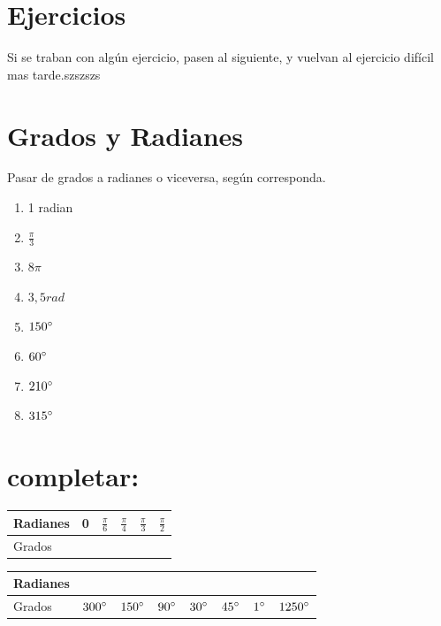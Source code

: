 \documentclass[a4paper,11pt,spanish,sans]{exam}
\newcommand{\Ts}{\rule{0pt}{2.6ex}}       %
\newcommand{\Bs}{\rule[-1.2ex]{0pt}{0pt}} %
\begin{document}
\section*{Ejercicios}

Si se traban con algún ejercicio, pasen al siguiente, y vuelvan al ejercicio difícil mas tarde.szszszs




\section{Grados y Radianes}

Pasar de grados a radianes o viceversa, según corresponda.

\begin{enumerate}
\item 1 radian
\item $\frac{\pi}{3}$
\item $8\pi$
\item $3,5 rad$
\item $150\degree$
\item $60\degree$
\item $210\degree$
\item $315\degree$
\end{enumerate}

\section{completar:}

\begin{center}
\label{completar}
\begin{tabular}{|l|c|c|c|c|c|}
\hline
Radianes & 0 & $\frac{\pi}{6} $ & $\frac{\pi}{4} $ & $\frac{\pi}{3} $ & $\frac{\pi}{2} $ \Ts \Bs \\ \hline
Grados  &    &  &   &   &    \Ts \Bs     \\ \hline
\end{tabular}
\end{center}

\begin{center}
\label{completar}
\begin{tabular}{|l|c|c|c|c|c|c|c|}
\hline
Radianes &  &  &   &   &  &  & \Ts \Bs \\ \hline
Grados  & $300\degree$   & $150\degree$  & $90\degree$   & $30\degree$  & $45\degree$ &  $1\degree$ & $1250\degree$ \Ts \Bs     \\ \hline
\end{tabular}
\end{center}
\end{document}

